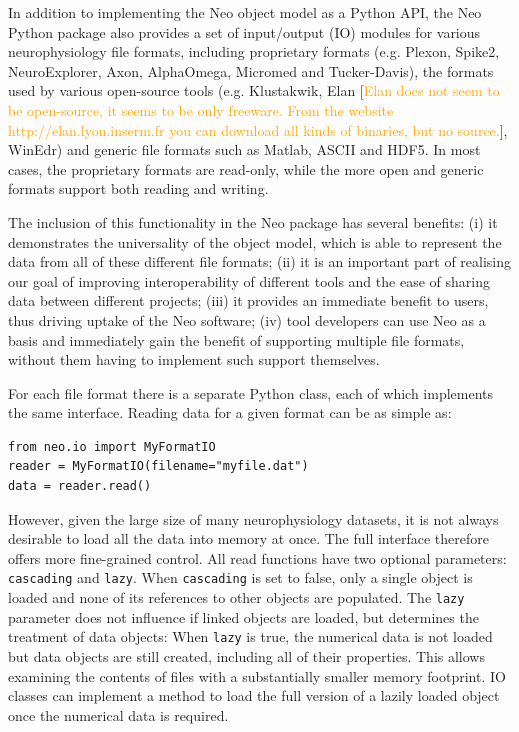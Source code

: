 \documentclass{frontiers}
\newcommand{\florent}[1]{[\textcolor{Orange}{#1}]}
\begin{document}
In addition to implementing the Neo object model as a Python API, the Neo Python package also provides a set of input/output (IO) modules for various neurophysiology file formats, including proprietary formats (e.g. Plexon, Spike2, NeuroExplorer, Axon, AlphaOmega, Micromed and Tucker-Davis), the formats used by various open-source tools (e.g. Klustakwik, Elan \florent{Elan does not seem to be open-source, it seems to be only freeware. From the website http://elan.lyon.inserm.fr you can download all kinds of binaries, but no source.}, WinEdr) and generic file formats such as Matlab, ASCII and HDF5. 
In most cases, the proprietary formats are read-only, while the more open and generic formats support both reading and writing.

The inclusion of this functionality in the Neo package has several benefits:
(i) it demonstrates the universality of the object model, which is able to represent the data from all of these different file formats;
(ii) it is an important part of realising our goal of improving interoperability of different tools and the ease of sharing data between different projects;
(iii) it provides an immediate benefit to users, thus driving uptake of the Neo software;
(iv) tool developers can use Neo as a basis and immediately gain the benefit of supporting multiple file formats, without them having to implement such support themselves.


For each file format there is a separate Python class, each of which implements the same interface. Reading data for a given format can be as simple as:

\begin{lstlisting}[style=display]
from neo.io import MyFormatIO
reader = MyFormatIO(filename="myfile.dat")
data = reader.read()
\end{lstlisting}

However, given the large size of many neurophysiology datasets, it is not always desirable to load all the data into memory at once. The full interface therefore offers more fine-grained control.
All read functions have two optional parameters: \lstinline`cascading` and \lstinline`lazy`.
When \lstinline`cascading` is set to false, only a single object is loaded and none of its references to other objects are populated.
The \lstinline`lazy` parameter does not influence if linked objects are loaded, but determines the treatment of data objects: When \lstinline`lazy` is true, the numerical data is not loaded but data objects are still created, including all of their properties. This allows examining the contents of files with a substantially smaller memory footprint. IO classes can implement a method to load the full version of a lazily loaded object once the numerical data is required.
\end{document}
